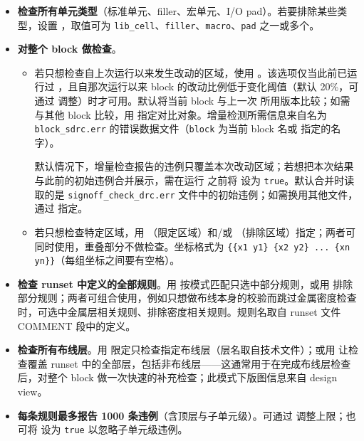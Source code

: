 \begin{itemize}
  \item \textbf{检查所有单元类型}（标准单元、filler、宏单元、I/O pad）。若要排除某些类型，设置 ，取值可为 \texttt{lib\_cell}、\texttt{filler}、\texttt{macro}、\texttt{pad} 之一或多个。

  \item \textbf{对整个 block 做检查}。
        \begin{itemize}
          \item 若只想检查自上次运行以来发生改动的区域，使用 。该选项仅当此前已运行过 ，且自那次运行以来 block 的改动比例低于变化阈值（默认 20\%，可通过  调整）时才可用。默认将当前 block 与上一次  所用版本比较；如需与其他 block 比较，用  指定对比对象。增量检测所需信息来自名为 \texttt{block\_sdrc.err} 的错误数据文件（\texttt{block} 为当前 block 名或  指定的名字）。

                默认情况下，增量检查报告的违例只覆盖本次改动区域；若想把本次结果与此前的初始违例合并展示，需在运行  之前将  设为 \texttt{true}。默认合并时读取的是 \texttt{signoff\_check\_drc.err} 文件中的初始违例；如需换用其他文件，通过  指定。
          \item 若只想检查特定区域，用 （限定区域）和/或 （排除区域）指定；两者可同时使用，重叠部分不做检查。坐标格式为 \texttt{\{\{x1 y1\} \{x2 y2\} ... \{xn yn\}\}}（每组坐标之间要有空格）。
        \end{itemize}

  \item \textbf{检查 runset 中定义的全部规则}。用  按模式匹配只选中部分规则，或用  排除部分规则；两者可组合使用，例如只想做布线本身的校验而跳过金属密度检查时，可选中金属层相关规则、排除密度相关规则。规则名取自 runset 文件 COMMENT 段中的定义。

  \item \textbf{检查所有布线层}。用  限定只检查指定布线层（层名取自技术文件）；或用  让检查覆盖 runset 中的全部层，包括非布线层——这通常用于在完成布线层检查后，对整个 block 做一次快速的补充检查；此模式下版图信息来自 design view。

  \item \textbf{每条规则最多报告 1000 条违例}（含顶层与子单元级）。可通过  调整上限；也可将  设为 \texttt{true} 以忽略子单元级违例。
\end{itemize}


